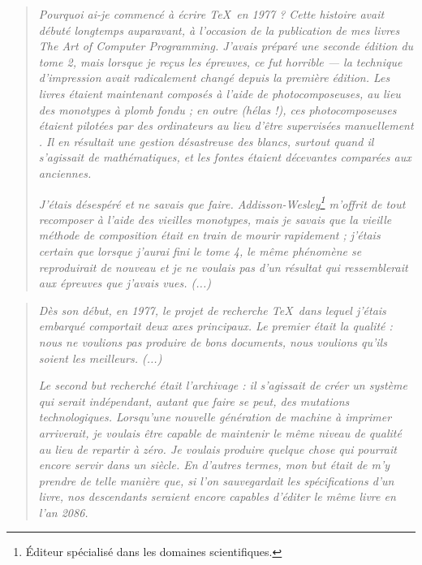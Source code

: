 \begin{quotation} %
\label{photoknuth} \og \emph{Pourquoi ai-je commencé à écrire \TeX\ en 1977 ? Cette histoire avait débuté longtemps auparavant, à l'occasion de la publication de mes livres \emph{The Art of Computer Programming}. J'avais préparé une seconde édition du tome 2, mais lorsque je reçus les épreuves, ce fut horrible --- la technique d'impression avait radicalement changé depuis la première édition. Les livres étaient maintenant composés à l'aide de photocomposeuses, au lieu des monotypes à plomb fondu ; en outre (hélas !), ces photocomposeuses étaient pilotées par des ordinateurs au lieu d'être supervisées \og manuellement \fg{}. Il en résultait une gestion désastreuse des blancs, surtout quand il s'agissait de mathématiques, et les fontes étaient décevantes comparées aux anciennes.} 

\emph{J'étais désespéré et ne savais que faire. \emph{Addisson-Wesley}\footnote{\'{E}diteur spécialisé dans les domaines scientifiques.} m'offrit de tout recomposer à l'aide des vieilles monotypes, mais je savais que la vieille méthode de composition était en train de mourir rapidement ; j'étais certain que lorsque j'aurai fini le tome 4, le même phénomène se reproduirait de nouveau et je ne voulais pas d'un résultat qui ressemblerait aux épreuves que j'avais vues. (...)} 
\end{quotation}

\begin{quotation}
\emph{Dès son début, en 1977, le projet de recherche \TeX\ dans lequel j'étais embarqué comportait deux axes principaux. Le premier était la qualité : nous ne voulions pas produire de bons documents, nous voulions qu'ils soient les meilleurs. (...)} 

\emph{Le second but recherché était l'archivage : il s'agissait de créer un système qui serait indépendant, autant que faire se peut, des mutations technologiques. Lorsqu'une nouvelle génération de machine à imprimer arriverait, je voulais être capable de maintenir le même niveau de qualité au lieu de repartir à zéro. Je voulais produire quelque chose qui pourrait encore servir dans un siècle. En d'autres termes, mon but était de m'y prendre de telle manière que, si l'on sauvegardait les spécifications d'un livre, nos descendants seraient encore capables d'éditer le même livre en l'an 2086.} \fg{}
\end{quotation}



